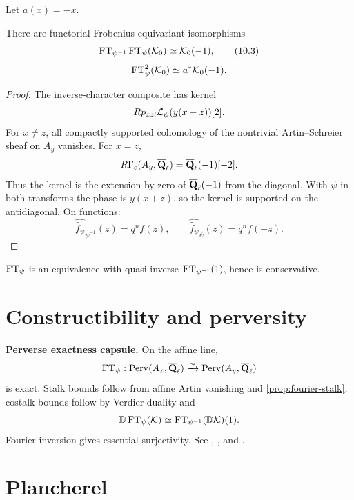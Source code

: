 Let \(a(x)=-x\).

\begin{theorem}
\label{thm:fourier-inversion}
There are functorial Frobenius-equivariant isomorphisms
\[
 \operatorname{FT}_{\psi^{-1}}\operatorname{FT}_\psi(\mathcal K_0)\simeq\mathcal K_0(-1),
\tag{10.3}\label{eq:fourier-inversion}
\]
\[
 \operatorname{FT}_\psi^2(\mathcal K_0)\simeq a^*\mathcal K_0(-1).
\]
\end{theorem}

\begin{proof}
The inverse-character composite has kernel
\[
 Rp_{xz!}\mathcal L_\psi(y(x-z))[2].
\]
For \(x\ne z\), all compactly supported cohomology of the nontrivial
Artin--Schreier sheaf on \(A_y\) vanishes.  For \(x=z\),
\[
 R\Gamma_c(A_y,\overline{\mathbf Q}_\ell)=\overline{\mathbf Q}_\ell(-1)[-2].
\]
Thus the kernel is the extension by zero of \(\overline{\mathbf Q}_\ell(-1)\) from the
diagonal.  With \(\psi\) in both transforms the phase is \(y(x+z)\), so
the kernel is supported on the antidiagonal.  On functions:
\[
 \widehat{\widehat f_\psi}_{\psi^{-1}}(z)=q^nf(z),
 \qquad
 \widehat{\widehat f_\psi}_{\psi}(z)=q^nf(-z).
\]
\end{proof}

\begin{corollary}
\label{cor:fourier-equivalence}
\(\operatorname{FT}_\psi\) is an equivalence with quasi-inverse
\(\operatorname{FT}_{\psi^{-1}}(1)\), hence is conservative.
\end{corollary}

\section{Constructibility and perversity}

\begin{foundation}
\label{found:fourier-perverse}
\textbf{Perverse exactness capsule.}
On the affine line,
\[
 \operatorname{FT}_\psi:\operatorname{Perv}(A_x,\overline{\mathbf Q}_\ell)
 \xrightarrow{\sim}\operatorname{Perv}(A_y,\overline{\mathbf Q}_\ell)
\]
is exact.  Stalk bounds follow from affine Artin vanishing and
\cref{prop:fourier-stalk}; costalk bounds follow by Verdier duality and
\[
 \mathbb D\operatorname{FT}_\psi(\mathcal K)
 \simeq\operatorname{FT}_{\psi^{-1}}(\mathbb D\mathcal K)(1).
\]
Fourier inversion gives essential surjectivity.  See
\cite{LaumonFourier},
\cite[Chapter~I, Section~5]{KiehlWeissauer}, and
\cite{StanfordL23}.
\end{foundation}

\section{Plancherel}

